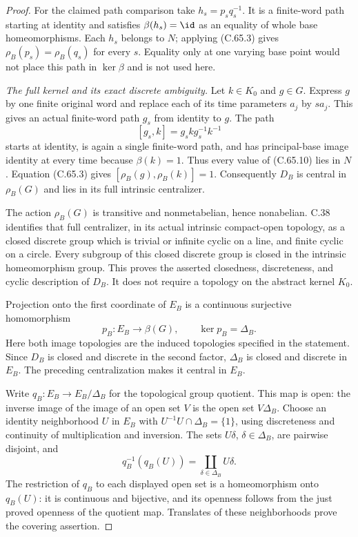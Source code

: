 \begin{proof}
For the claimed path comparison take
$h_s=p_sq_s^{-1}$. It is a finite-word
path starting at identity and satisfies
$\beta(h_s)=\id$ as an equality of whole
base homeomorphisms. Each $h_s$ belongs
to $N$; applying (C.65.3) gives
$\rho_B(p_s)=\rho_B(q_s)$ for every $s$.
Equality only at one varying base point
would not place this path in $\ker\beta$
and is not used here.

\emph{The full kernel and its exact discrete ambiguity.}
Let $k\in K_0$ and $g\in G$. Express $g$ by
one finite original word and replace each of its
time parameters $a_j$ by $s a_j$. This gives
an actual finite-word path $g_s$ from identity
to $g$. The path
\[
               [g_s,k]=g_s k g_s^{-1}k^{-1}
                                                               \tag{C.65.10}
\]
starts at identity, is again a single finite-word
path, and has principal-base image identity
at every time because $\beta(k)=1$.
Thus every value of (C.65.10) lies in $N$.
Equation (C.65.3) gives
$[\rho_B(g),\rho_B(k)]=1$.
Consequently $D_B$ is central in $\rho_B(G)$
and lies in its full intrinsic centralizer.

The action $\rho_B(G)$ is transitive and
nonmetabelian, hence nonabelian. C.38 identifies
that full centralizer, in its actual intrinsic
compact-open topology, as a closed discrete
group which is trivial or infinite cyclic
on a line, and finite cyclic on a circle.
Every subgroup of this closed discrete group
is closed in the intrinsic homeomorphism
group. This proves the asserted closedness,
discreteness, and cyclic description of $D_B$.
It does not require a topology on the
abstract kernel $K_0$.

Projection onto the first coordinate of
$E_B$ is a continuous surjective
homomorphism
\[
       p_B:E_B\longrightarrow\beta(G),
       \qquad \ker p_B=\Delta_B.                       \tag{C.65.11}
\]
Here both image topologies are the induced
topologies specified in the statement.
Since $D_B$ is closed and discrete in the
second factor, $\Delta_B$ is closed and
discrete in $E_B$. The preceding
centralization makes it central in $E_B$.

Write $q_B:E_B\to E_B/\Delta_B$ for the
topological group quotient. This map is
open: the inverse image of the image of
an open set $V$ is the open set
$V\Delta_B$. Choose an identity
neighborhood $U$ in $E_B$ with
$U^{-1}U\cap\Delta_B=\{1\}$, using
discreteness and continuity of multiplication
and inversion. The sets $U\delta$,
$\delta\in\Delta_B$, are pairwise disjoint,
and
\[
 q_B^{-1}(q_B(U))
       =\coprod_{\delta\in\Delta_B}U\delta.             \tag{C.65.12}
\]
The restriction of $q_B$ to each displayed
open set is a homeomorphism onto $q_B(U)$:
it is continuous and bijective, and its
openness follows from the just proved
openness of the quotient map. Translates
of these neighborhoods prove the covering
assertion.


\end{proof}
